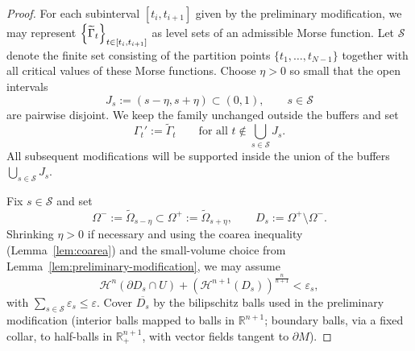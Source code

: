 \begin{lemma}
\begin{proof}
        For each subinterval $[t_i,t_{i+1}]$ given by the preliminary modification, we may represent
        $\left\{\widetilde{\Gamma}_t\right\}_{t\in[t_i,t_{i+1}]}$ as level sets of an admissible Morse function.
        Let $\mathcal{S}$ denote the finite set consisting of the partition points $\{t_1,\dots,t_{N-1}\}$ together
        with all critical values of these Morse functions. Choose $\eta>0$ so small that the open intervals
        \begin{equation*}
            J_s:=(s-\eta,s+\eta)\subset(0,1),\qquad s\in\mathcal{S}
        \end{equation*}
        are pairwise disjoint. We keep the family unchanged outside the buffers and set
        \begin{equation*}
            \Gamma_t':=\widetilde{\Gamma}_t\qquad\text{for all }t\notin \bigcup_{s\in\mathcal S}J_s.
        \end{equation*}
        All subsequent modifications will be supported inside the union of the buffers $\bigcup_{s\in\mathcal S}J_s$.
        
        Fix $s\in\mathcal S$ and set
        \begin{equation*}
            \Omega^-:=\widetilde{\Omega}_{s-\eta}\subset \Omega^+:=\widetilde{\Omega}_{s+\eta},
            \qquad
            D_s:=\Omega^+\setminus\Omega^-.
        \end{equation*}
        Shrinking $\eta>0$ if necessary and using the coarea inequality (Lemma~\ref{lem:coarea}) and the small-volume choice from Lemma~\ref{lem:preliminary-modification}, we may assume
        \begin{equation*}
          \mathcal{H}^n(\partial D_s\cap U)+
          (\mathcal{H}^{n+1}(D_s))^{\frac{n}{n+1}}
          <\varepsilon_s,
        \end{equation*}
        with $\sum_{s\in\mathcal S}\varepsilon_s\le \varepsilon$. Cover $\overline{D_s}$ by the bilipschitz balls used in the preliminary modification (interior balls mapped to balls in $\mathbb R^{n+1}$; boundary balls, via a fixed collar, to half-balls in $\mathbb R^{n+1}_+$, with vector fields tangent to $\partial M$).
        

\end{proof}
\end{lemma}
